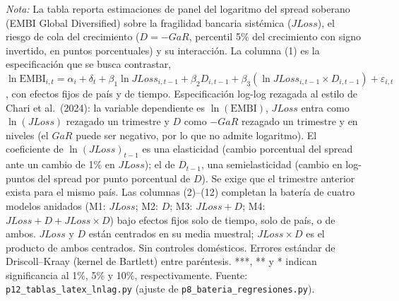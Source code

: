 \documentclass[11pt]{article}
\begin{document}
\begin{landscape}
\begin{table}
\par\smallskip\parbox{\linewidth}{\scriptsize \textit{Nota:} La tabla reporta estimaciones de panel del logaritmo del spread soberano (EMBI Global Diversified) sobre la fragilidad bancaria sistémica ($JLoss$), el riesgo de cola del crecimiento ($D=-GaR$, percentil 5\% del crecimiento con signo invertido, en puntos porcentuales) y su interacción. La columna (1) es la especificación que se busca contrastar, $\ln\mathrm{EMBI}_{i,t}=\alpha_i+\delta_t+\beta_1\ln JLoss_{i,t-1}+\beta_2 D_{i,t-1}+\beta_3(\ln JLoss_{i,t-1}\times D_{i,t-1})+\varepsilon_{i,t}$, con efectos fijos de país y de tiempo. Especificación log-log rezagada al estilo de Chari et al.\ (2024): la variable dependiente es $\ln(\mathrm{EMBI})$, $JLoss$ entra como $\ln(JLoss)$ rezagado un trimestre y $D$ como $-GaR$ rezagado un trimestre y en niveles (el $GaR$ puede ser negativo, por lo que no admite logaritmo). El coeficiente de $\ln(JLoss)_{t-1}$ es una elasticidad (cambio porcentual del spread ante un cambio de 1\% en $JLoss$); el de $D_{t-1}$, una semielasticidad (cambio en log-puntos del spread por punto porcentual de $D$). Se exige que el trimestre anterior exista para el mismo país. Las columnas (2)--(12) completan la batería de cuatro modelos anidados (M1: $JLoss$; M2: $D$; M3: $JLoss+D$; M4: $JLoss+D+JLoss\times D$) bajo efectos fijos solo de tiempo, solo de país, o de ambos. $JLoss$ y $D$ están centrados en su media muestral; $JLoss\times D$ es el producto de ambos centrados. Sin controles domésticos. Errores estándar de Driscoll--Kraay (kernel de Bartlett) entre paréntesis. ***, ** y * indican significancia al 1\%, 5\% y 10\%, respectivamente. Fuente: \texttt{p12\_tablas\_latex\_lnlag.py} (ajuste de \texttt{p8\_bateria\_regresiones.py}).}
\end{table}
\end{landscape}

\clearpage
\end{document}
